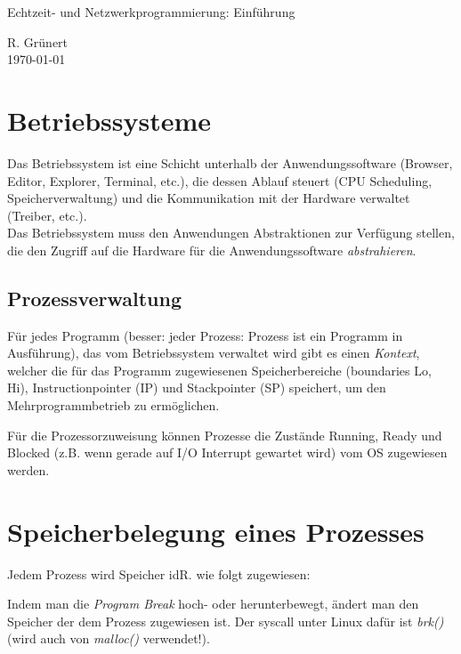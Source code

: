 \documentclass[11pt, a4paper]{article}
\begin{document}
\begin{center}
  \Large{Echtzeit- und Netzwerkprogrammierung: Einführung}
\end{center}

\begin{flushright}
  R. Grünert\\
  \today
\end{flushright}

\section{Betriebssysteme}
Das Betriebssystem ist eine Schicht unterhalb der Anwendungssoftware (Browser, Editor, Explorer, Terminal, etc.), die dessen Ablauf steuert (CPU Scheduling, Speicherverwaltung) und die Kommunikation mit der Hardware verwaltet (Treiber, etc.).\\

Das Betriebssystem muss den Anwendungen \glqq Abstraktionen\grqq{} zur Verfügung stellen, die den Zugriff auf die Hardware für die Anwendungssoftware \emph{abstrahieren}.

\subsection{Prozessverwaltung}
\begin{figure}[H]
\centering
{}
\end{figure}

Für jedes Programm (besser: jeder Prozess: Prozess ist ein Programm in Ausführung), das vom Betriebssystem verwaltet wird gibt es einen \emph{Kontext}, welcher die für das Programm zugewiesenen Speicherbereiche (boundaries Lo, Hi), Instructionpointer (IP) und Stackpointer (SP) speichert, um den Mehrprogrammbetrieb zu ermöglichen.

Für die Prozessorzuweisung können Prozesse die Zustände Running, Ready und Blocked (z.B. wenn gerade auf I/O Interrupt gewartet wird) vom OS zugewiesen werden.

\section{Speicherbelegung eines Prozesses}
Jedem Prozess wird Speicher idR. wie folgt zugewiesen:

\begin{figure}[H]
\centering
{}
\end{figure}

Indem man die \emph{Program Break} hoch- oder herunterbewegt, ändert man den Speicher der dem Prozess zugewiesen ist. Der syscall unter Linux dafür ist \emph{brk()} (wird auch von \emph{malloc()} verwendet!).


\end{document}
